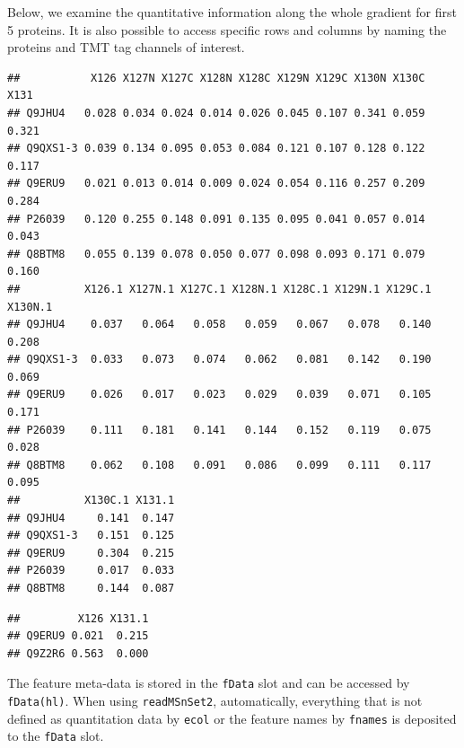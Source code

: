 Below, we examine the quantitative information along the whole
gradient for first 5 proteins.  It is also possible to access specific
rows and columns by naming the proteins and TMT tag channels of
interest.

\begin{knitrout}
\color{fgcolor}\begin{kframe}
\begin{alltt}
\hlstd{(hl)[}\hlopt{:}\hlstd{, ]}
\end{alltt}
\begin{verbatim}
##           X126 X127N X127C X128N X128C X129N X129C X130N X130C  X131
## Q9JHU4   0.028 0.034 0.024 0.014 0.026 0.045 0.107 0.341 0.059 0.321
## Q9QXS1-3 0.039 0.134 0.095 0.053 0.084 0.121 0.107 0.128 0.122 0.117
## Q9ERU9   0.021 0.013 0.014 0.009 0.024 0.054 0.116 0.257 0.209 0.284
## P26039   0.120 0.255 0.148 0.091 0.135 0.095 0.041 0.057 0.014 0.043
## Q8BTM8   0.055 0.139 0.078 0.050 0.077 0.098 0.093 0.171 0.079 0.160
##          X126.1 X127N.1 X127C.1 X128N.1 X128C.1 X129N.1 X129C.1 X130N.1
## Q9JHU4    0.037   0.064   0.058   0.059   0.067   0.078   0.140   0.208
## Q9QXS1-3  0.033   0.073   0.074   0.062   0.081   0.142   0.190   0.069
## Q9ERU9    0.026   0.017   0.023   0.029   0.039   0.071   0.105   0.171
## P26039    0.111   0.181   0.141   0.144   0.152   0.119   0.075   0.028
## Q8BTM8    0.062   0.108   0.091   0.086   0.099   0.111   0.117   0.095
##          X130C.1 X131.1
## Q9JHU4     0.141  0.147
## Q9QXS1-3   0.151  0.125
## Q9ERU9     0.304  0.215
## P26039     0.017  0.033
## Q8BTM8     0.144  0.087
\end{verbatim}
\begin{alltt}
\hlstd{(hl)[}\hlstd{(}\hlstd{,} \hlstd{),} \hlstd{(}\hlstd{,} \hlstd{)]}
\end{alltt}
\begin{verbatim}
##         X126 X131.1
## Q9ERU9 0.021  0.215
## Q9Z2R6 0.563  0.000
\end{verbatim}
\end{kframe}
\end{knitrout}

The feature meta-data is stored in the \texttt{fData} slot and can be
accessed by \texttt{fData(hl)}. When using \texttt{readMSnSet2}, automatically,
everything that is not defined as quantitation data by \texttt{ecol} or the
feature names by \texttt{fnames} is deposited to the \texttt{fData} slot.

